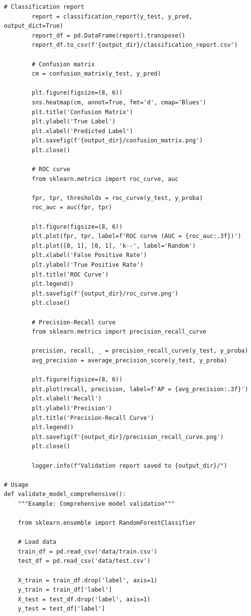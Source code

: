 \begin{lstlisting}[style=python, caption=Production Model Validation Framework]
        # Classification report
        report = classification_report(y_test, y_pred, output_dict=True)
        report_df = pd.DataFrame(report).transpose()
        report_df.to_csv(f'{output_dir}/classification_report.csv')

        # Confusion matrix
        cm = confusion_matrix(y_test, y_pred)

        plt.figure(figsize=(8, 6))
        sns.heatmap(cm, annot=True, fmt='d', cmap='Blues')
        plt.title('Confusion Matrix')
        plt.ylabel('True Label')
        plt.xlabel('Predicted Label')
        plt.savefig(f'{output_dir}/confusion_matrix.png')
        plt.close()

        # ROC curve
        from sklearn.metrics import roc_curve, auc

        fpr, tpr, thresholds = roc_curve(y_test, y_proba)
        roc_auc = auc(fpr, tpr)

        plt.figure(figsize=(8, 6))
        plt.plot(fpr, tpr, label=f'ROC curve (AUC = {roc_auc:.3f})')
        plt.plot([0, 1], [0, 1], 'k--', label='Random')
        plt.xlabel('False Positive Rate')
        plt.ylabel('True Positive Rate')
        plt.title('ROC Curve')
        plt.legend()
        plt.savefig(f'{output_dir}/roc_curve.png')
        plt.close()

        # Precision-Recall curve
        from sklearn.metrics import precision_recall_curve

        precision, recall, _ = precision_recall_curve(y_test, y_proba)
        avg_precision = average_precision_score(y_test, y_proba)

        plt.figure(figsize=(8, 6))
        plt.plot(recall, precision, label=f'AP = {avg_precision:.3f}')
        plt.xlabel('Recall')
        plt.ylabel('Precision')
        plt.title('Precision-Recall Curve')
        plt.legend()
        plt.savefig(f'{output_dir}/precision_recall_curve.png')
        plt.close()

        logger.info(f"Validation report saved to {output_dir}/")

# Usage
def validate_model_comprehensive():
    """Example: Comprehensive model validation"""

    from sklearn.ensemble import RandomForestClassifier

    # Load data
    train_df = pd.read_csv('data/train.csv')
    test_df = pd.read_csv('data/test.csv')

    X_train = train_df.drop('label', axis=1)
    y_train = train_df['label']
    X_test = test_df.drop('label', axis=1)
    y_test = test_df['label']


\end{lstlisting}
